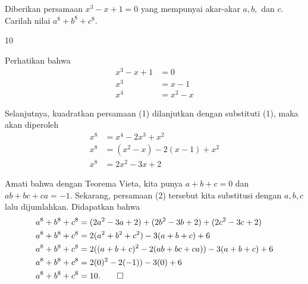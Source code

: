 \documentclass[11pt]{scrartcl}
\begin{document}
	\begin{soalbaru}
		Diberikan persamaan $x^3-x+1=0$ yang mempunyai akar-akar $a,b,$ dan $c$. Carilah nilai $a^8+b^8+c^8$.
		\begin{jawaban}
		10
		\end{jawaban}
		\begin{solusi}
		Perhatikan bahwa \begin{equation}
		\begin{split}
		x^3 - x +1&=0\\
		x^3 &= x-1\\
		x^4 &= x^2 -x
		\end{split}
		\end{equation}
		
		Selanjutnya, kuadratkan persamaan (1) dilanjutkan dengan substituti (1), maka akan diperoleh
		\begin{equation}
		\begin{split}
		x^8 &= x^4 -2x^3 +x^2\\
		x^8 &= (x^2-x)-2(x-1)+x^2\\
		x^8 &= 2x^2-3x+2
		\end{split}
		\end{equation}
		
		Amati bahwa dengan Teorema Vieta, kita punya $a+b+c=0$ dan $ab+bc+ca=-1$. Sekarang, persamaan (2) tersebut kita substitusi dengan $a,b,c$ lalu dijumlahkan. Didapatkan bahwa
		\begin{equation*}
		\begin{split}
		a^8+b^8+c^8&=(2a^2-3a+2)+(2b^2-3b+2)+(2c^2-3c+2)\\
		a^8+b^8+c^8&=2(a^2+b^2+c^2)-3(a+b+c)+6\\
		a^8+b^8+c^8&=2((a+b+c)^2-2(ab+bc+ca))-3(a+b+c)+6\\
		a^8+b^8+c^8&=2(0)^2-2(-1))-3(0)+6\\
		a^8+b^8+c^8&=10. \qed
		\end{split}
		\end{equation*}
		\end{solusi}
	\end{soalbaru}
	
\end{document}
